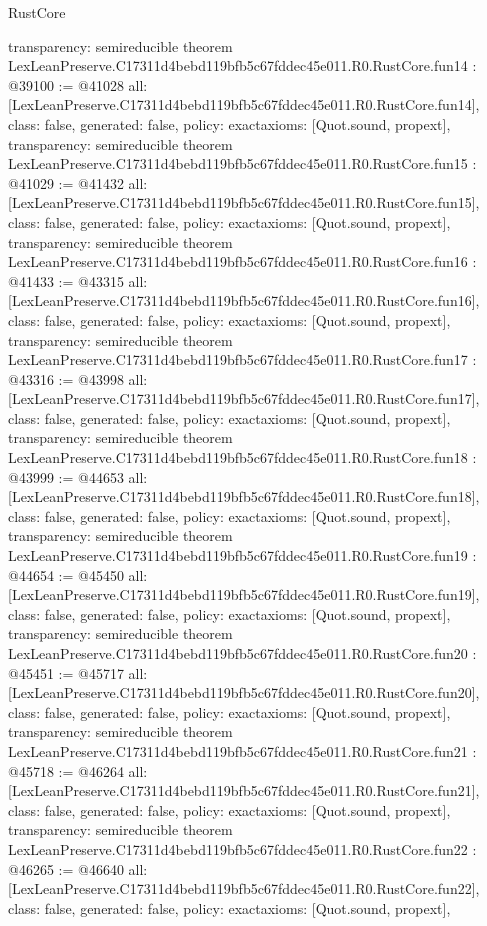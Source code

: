 \begin{lexlean}{RustCore}
\begin{coremodule}
{  transparency: semireducible
}
theorem LexLeanPreserve.C17311d4bebd119bfb5c67fddec45e011.R0.RustCore.fun14 : @39100 := @41028 {
  all: [LexLeanPreserve.C17311d4bebd119bfb5c67fddec45e011.R0.RustCore.fun14],
  class: false,
  generated: false,
  policy: exact{axioms: [Quot.sound, propext]},
  transparency: semireducible
}
theorem LexLeanPreserve.C17311d4bebd119bfb5c67fddec45e011.R0.RustCore.fun15 : @41029 := @41432 {
  all: [LexLeanPreserve.C17311d4bebd119bfb5c67fddec45e011.R0.RustCore.fun15],
  class: false,
  generated: false,
  policy: exact{axioms: [Quot.sound, propext]},
  transparency: semireducible
}
theorem LexLeanPreserve.C17311d4bebd119bfb5c67fddec45e011.R0.RustCore.fun16 : @41433 := @43315 {
  all: [LexLeanPreserve.C17311d4bebd119bfb5c67fddec45e011.R0.RustCore.fun16],
  class: false,
  generated: false,
  policy: exact{axioms: [Quot.sound, propext]},
  transparency: semireducible
}
theorem LexLeanPreserve.C17311d4bebd119bfb5c67fddec45e011.R0.RustCore.fun17 : @43316 := @43998 {
  all: [LexLeanPreserve.C17311d4bebd119bfb5c67fddec45e011.R0.RustCore.fun17],
  class: false,
  generated: false,
  policy: exact{axioms: [Quot.sound, propext]},
  transparency: semireducible
}
theorem LexLeanPreserve.C17311d4bebd119bfb5c67fddec45e011.R0.RustCore.fun18 : @43999 := @44653 {
  all: [LexLeanPreserve.C17311d4bebd119bfb5c67fddec45e011.R0.RustCore.fun18],
  class: false,
  generated: false,
  policy: exact{axioms: [Quot.sound, propext]},
  transparency: semireducible
}
theorem LexLeanPreserve.C17311d4bebd119bfb5c67fddec45e011.R0.RustCore.fun19 : @44654 := @45450 {
  all: [LexLeanPreserve.C17311d4bebd119bfb5c67fddec45e011.R0.RustCore.fun19],
  class: false,
  generated: false,
  policy: exact{axioms: [Quot.sound, propext]},
  transparency: semireducible
}
theorem LexLeanPreserve.C17311d4bebd119bfb5c67fddec45e011.R0.RustCore.fun20 : @45451 := @45717 {
  all: [LexLeanPreserve.C17311d4bebd119bfb5c67fddec45e011.R0.RustCore.fun20],
  class: false,
  generated: false,
  policy: exact{axioms: [Quot.sound, propext]},
  transparency: semireducible
}
theorem LexLeanPreserve.C17311d4bebd119bfb5c67fddec45e011.R0.RustCore.fun21 : @45718 := @46264 {
  all: [LexLeanPreserve.C17311d4bebd119bfb5c67fddec45e011.R0.RustCore.fun21],
  class: false,
  generated: false,
  policy: exact{axioms: [Quot.sound, propext]},
  transparency: semireducible
}
theorem LexLeanPreserve.C17311d4bebd119bfb5c67fddec45e011.R0.RustCore.fun22 : @46265 := @46640 {
  all: [LexLeanPreserve.C17311d4bebd119bfb5c67fddec45e011.R0.RustCore.fun22],
  class: false,
  generated: false,
  policy: exact{axioms: [Quot.sound, propext]},
}
\end{coremodule}
\end{lexlean}
